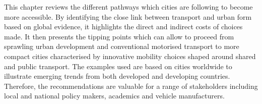 This chapter reviews the different pathways which cities are following to become more accessible. By identifying the close link between transport and urban form based on global evidence, it highlights the direct and indirect costs of choices made. It then presents the tipping points which can allow to proceed from sprawling urban development and conventional motorised transport to more compact cities characterised by innovative mobility choices shaped around shared and public transport. The examples used are based on cities worldwide to illustrate emerging trends from both developed and developing countries. Therefore, the recommendations are valuable for a range of stakeholders including local and national policy makers, academics and vehicle manufacturers.